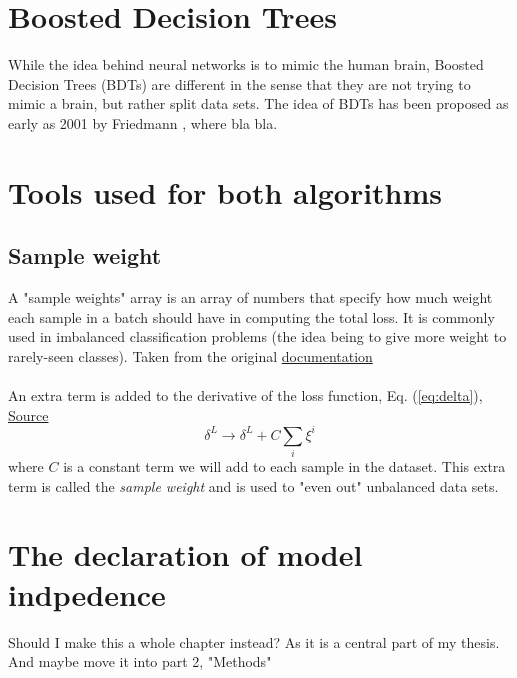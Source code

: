 \documentclass[14pt, a4paper]{book}
\begin{document}
\clearpage




\section{Boosted Decision Trees}
While the idea behind neural networks is to mimic the human brain, Boosted Decision Trees (BDTs) are different in the sense that they are not trying to mimic a brain, but rather split data sets. The idea of BDTs has been proposed as early as 2001 by Friedmann \cite{BDT_Friedman}, 
where bla bla.

\section{Tools used for both algorithms}
\subsection{Sample weight}\label{sec:sample_weight}
A "sample weights" array is an array of numbers that specify how much weight each sample in a batch should have in computing the total loss. 
It is commonly used in imbalanced classification problems (the idea being to give more weight to rarely-seen classes). Taken from the original \href{https://www.tensorflow.org/guide/keras/train_and_evaluate#sample_weights}{documentation}\\
\\An extra term is added to the derivative of the loss function, Eq. (\ref{eq:delta}), \href{https://scikit-learn.org/stable/modules/svm.html#svc}{Source}
\begin{equation}
    \delta^L \rightarrow \delta^L + C\sum_i \xi^i
\end{equation} 
where $C$ is a constant term we will add to each sample in the dataset. This extra term is called the \textit{sample weight} and is used to "even out" unbalanced data sets. 

\section{The declaration of model indpedence}
Should I make this a whole chapter instead? As it is a central part of my thesis. And maybe move it into part 2, "Methods"
\end{document}
